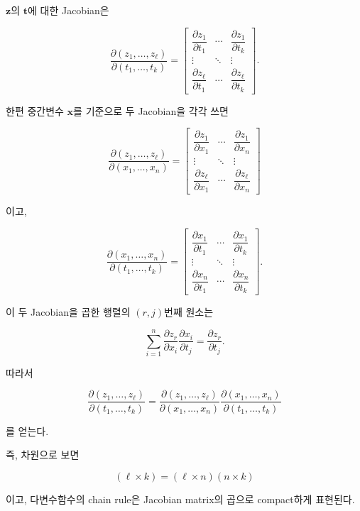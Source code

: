 \documentclass[11pt,a4paper]{article}
\begin{document}
$\mathbf z$의 $\mathbf t$에 대한 Jacobian은

\[
\frac{\partial(z_1,\ldots,z_\ell)}
     {\partial(t_1,\ldots,t_k)}
=
\begin{bmatrix}
\dfrac{\partial z_1}{\partial t_1} &
\cdots &
\dfrac{\partial z_1}{\partial t_k}
\\[0.8em]
\vdots & \ddots & \vdots
\\[0.8em]
\dfrac{\partial z_\ell}{\partial t_1} &
\cdots &
\dfrac{\partial z_\ell}{\partial t_k}
\end{bmatrix}.
\]

한편 중간변수 $\mathbf x$를 기준으로 두 Jacobian을 각각 쓰면

\[
\frac{\partial(z_1,\ldots,z_\ell)}
     {\partial(x_1,\ldots,x_n)}
=
\begin{bmatrix}
\dfrac{\partial z_1}{\partial x_1} &
\cdots &
\dfrac{\partial z_1}{\partial x_n}
\\[0.8em]
\vdots & \ddots & \vdots
\\[0.8em]
\dfrac{\partial z_\ell}{\partial x_1} &
\cdots &
\dfrac{\partial z_\ell}{\partial x_n}
\end{bmatrix}
\]

이고,

\[
\frac{\partial(x_1,\ldots,x_n)}
     {\partial(t_1,\ldots,t_k)}
=
\begin{bmatrix}
\dfrac{\partial x_1}{\partial t_1} &
\cdots &
\dfrac{\partial x_1}{\partial t_k}
\\[0.8em]
\vdots & \ddots & \vdots
\\[0.8em]
\dfrac{\partial x_n}{\partial t_1} &
\cdots &
\dfrac{\partial x_n}{\partial t_k}
\end{bmatrix}.
\]

이 두 Jacobian을 곱한 행렬의 $(r,j)$번째 원소는

\[
\sum_{i=1}^{n}
\frac{\partial z_r}{\partial x_i}
\frac{\partial x_i}{\partial t_j}
=
\frac{\partial z_r}{\partial t_j}.
\]

따라서

\[
\boxed{
\frac{\partial(z_1,\ldots,z_\ell)}
     {\partial(t_1,\ldots,t_k)}
=
\frac{\partial(z_1,\ldots,z_\ell)}
     {\partial(x_1,\ldots,x_n)}
\frac{\partial(x_1,\ldots,x_n)}
     {\partial(t_1,\ldots,t_k)}
}
\]

를 얻는다.

즉, 차원으로 보면

\[
(\ell\times k)
=
(\ell\times n)(n\times k)
\]

이고, 다변수함수의 chain rule은 Jacobian matrix의 곱으로
compact하게 표현된다.
\end{document}
